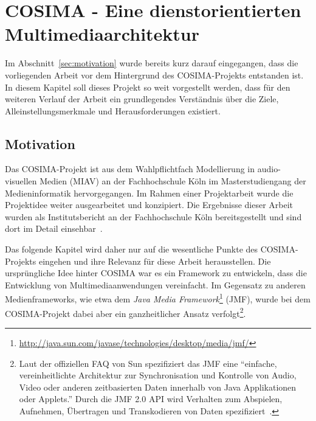 
\chapter{COSIMA - Eine dienstorientierten Multimediaarchitektur} %
\label{cha:eine_dienstorientierten_multimediaarchitektur}

  Im Abschnitt~\ref{sec:motivation} wurde bereits kurz darauf eingegangen, dass die vorliegenden Arbeit vor dem Hintergrund des COSIMA-Projekts entstanden ist. In diesem Kapitel soll dieses Projekt so weit vorgestellt werden, dass für den weiteren Verlauf der Arbeit ein grundlegendes Verständnis über die Ziele, Alleinstellungsmerkmale und Herausforderungen existiert.
  
\section{Motivation} %
\label{sec:motivation_cosima}

  Das COSIMA-Projekt ist aus dem Wahlpflichtfach Modellierung in audio-visuellen Medien (MIAV) an der Fachhochschule Köln im Masterstudiengang der Medieninformatik hervorgegangen. Im Rahmen einer Projektarbeit wurde die Projektidee weiter ausgearbeitet und konzipiert. Die Ergebnisse dieser Arbeit wurden als Institutsbericht an der Fachhochschule Köln bereitsgestellt und sind dort im Detail einsehbar~\citep{bericht}.
  
  Das folgende Kapitel wird daher nur auf die wesentliche Punkte des COSIMA-Projekts eingehen und ihre Relevanz für diese Arbeit herausstellen. Die ursprüngliche Idee hinter COSIMA war es ein Framework zu entwickeln, dass die Entwicklung von Multimediaanwendungen vereinfacht. Im Gegensatz zu anderen Medienframeworks, wie etwa dem \emph{Java Media Framework}\footnote{\url{http://java.sun.com/javase/technologies/desktop/media/jmf/}} (JMF), wurde bei dem COSIMA-Projekt dabei aber ein ganzheitlicher Ansatz verfolgt\footnote{Laut der offiziellen FAQ von Sun spezifiziert das JMF eine "`einfache, vereinheitlichte Architektur zur Synchronisation und Kontrolle von Audio, Video oder anderen zeitbasierten Daten innerhalb von Java Applikationen oder Applets."' Durch die JMF 2.0 API wird Verhalten zum Abspielen, Aufnehmen, Übertragen und Transkodieren von Daten spezifiziert~\citep{jmf_faq}.}.
  
